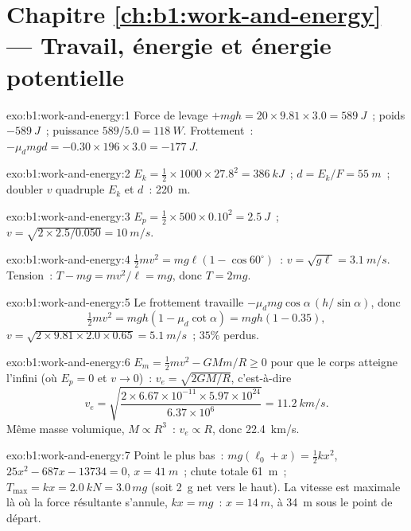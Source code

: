 \section*{Chapitre \ref{ch:b1:work-and-energy} --- Travail, énergie et énergie potentielle}

\begin{solution}{exo:b1:work-and-energy:1}
Force de levage $+mgh = 20 \times 9.81 \times 3.0 = \qty{589}{J}$~; poids
$-\qty{589}{J}$~; puissance $589/5.0 = \qty{118}{W}$. Frottement~: $-\mu_dmgd =
-0.30 \times 196 \times 3.0 = \qty{-177}{J}$.
\end{solution}

\begin{solution}{exo:b1:work-and-energy:2}
$E_k = \tfrac12 \times 1000 \times 27.8^2 = \qty{386}{kJ}$~; $d = E_k/F =
\qty{55}{m}$~; doubler $v$ quadruple $E_k$ et $d$~: \qty{220}{m}.
\end{solution}

\begin{solution}{exo:b1:work-and-energy:3}
$E_p = \tfrac12 \times 500 \times 0.10^2 = \qty{2.5}{J}$~; $v = \sqrt{2 \times
2.5/0.050} = \qty{10}{m/s}$.
\end{solution}

\begin{solution}{exo:b1:work-and-energy:4}
$\tfrac12 mv^2 = mg\ell(1 - \cos 60^\circ)$~: $v = \sqrt{g\ell} = \qty{3.1}{m/s}$.
Tension~: $T - mg = mv^2/\ell = mg$, donc $T = 2mg$.
\end{solution}

\begin{solution}{exo:b1:work-and-energy:5}
Le frottement travaille $-\mu_dmg\cos\alpha\,(h/\sin\alpha)$, donc
\[
\tfrac12 mv^2 = mgh(1 - \mu_d\cot\alpha) = mgh(1 - 0.35),
\]
$v = \sqrt{2 \times 9.81 \times 2.0 \times 0.65} = \qty{5.1}{m/s}$~; $35\%$ perdus.
\end{solution}

\begin{solution}{exo:b1:work-and-energy:6}
$E_m = \tfrac12 mv^2 - GMm/R \geq 0$ pour que le corps atteigne l'infini
(où $E_p = 0$ et $v \to 0$)~: $v_e = \sqrt{2GM/R}$, c'est-à-dire
\[
v_e = \sqrt{\frac{2 \times 6.67\times10^{-11} \times 5.97\times10^{24}}{6.37\times10^6}}
= \qty{11.2}{km/s}.
\]
Même masse volumique, $M \propto R^3$~: $v_e \propto R$, donc \qty{22.4}{km/s}.
\end{solution}

\begin{solution}{exo:b1:work-and-energy:7}
Point le plus bas~: $mg(\ell_0 + x) = \tfrac12 kx^2$, $25x^2 - 687x - 13734 = 0$,
$x = \qty{41}{m}$~; chute totale \qty{61}{m}~; $T_{\max} = kx = \qty{2.0}{kN}
= 3.0\,mg$ (soit \qty{2}{g} net vers le haut). La vitesse est maximale là
où la force résultante s'annule, $kx = mg$~: $x = \qty{14}{m}$, à
\qty{34}{m} sous le point de départ.
\end{solution}

